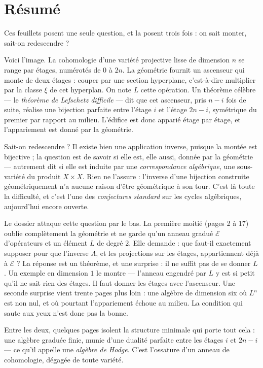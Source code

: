 \documentclass[11pt,a4paper]{article}
\begin{document}
\section*{Résumé}

\begin{resume}
Ces feuillets posent une seule question, et la posent trois fois : on sait
monter, sait-on redescendre ?

Voici l'image. La cohomologie d'une variété projective lisse de dimension $n$
se range par étages, numérotés de $0$ à $2n$. La géométrie fournit un ascenseur
qui monte de deux étages : couper par une section hyperplane, c'est-à-dire
multiplier par la classe $\xi$ de cet hyperplan. On note $L$ cette opération.
Un théorème célèbre --- le \emph{théorème de Lefschetz difficile} --- dit que
cet ascenseur, pris $n-i$ fois de suite, réalise une bijection parfaite entre
l'étage $i$ et l'étage $2n-i$, symétrique du premier par rapport au milieu.
L'édifice est donc apparié étage par étage, et l'appariement est donné par la
géométrie.

Sait-on redescendre ? Il existe bien une application inverse, puisque la montée
est bijective ; la question est de savoir si elle est, elle aussi, donnée par
la géométrie --- autrement dit si elle est induite par une
\emph{correspondance algébrique}, une sous-variété du produit
$X \times X$. Rien ne l'assure : l'inverse d'une bijection construite
géométriquement n'a aucune raison d'être géométrique à son tour. C'est là
toute la difficulté, et c'est l'une des \emph{conjectures standard} sur les
cycles algébriques, aujourd'hui encore ouverte.

Le dossier attaque cette question par le bas. La première moitié (pages 2 à
17) oublie complètement la géométrie et ne garde qu'un anneau gradué
$\mathcal{E}$ d'opérateurs et un élément $L$ de degré $2$. Elle demande : que
faut-il exactement supposer pour que l'inverse $\Lambda$, et les projections
sur les étages, appartiennent déjà à $\mathcal{E}$ ? La réponse est un
théorème, et une surprise : il ne suffit pas de se donner $L$. Un exemple en
dimension $1$ le montre --- l'anneau engendré par $L$ y est si petit qu'il ne
sait rien des étages. Il faut donner les étages avec l'ascenseur. Une
seconde surprise vient trente pages plus loin : une algèbre de dimension six
où $L^{n}$ est non nul, et où pourtant l'appariement échoue au milieu. La
condition qui saute aux yeux n'est donc pas la bonne.

Entre les deux, quelques pages isolent la structure minimale qui porte tout
cela : une algèbre graduée finie, munie d'une dualité parfaite entre les
étages $i$ et $2n-i$ --- ce qu'il appelle une \emph{algèbre de Hodge}. C'est
l'ossature d'un anneau de cohomologie, dégagée de toute variété.


\end{resume}
\end{document}
